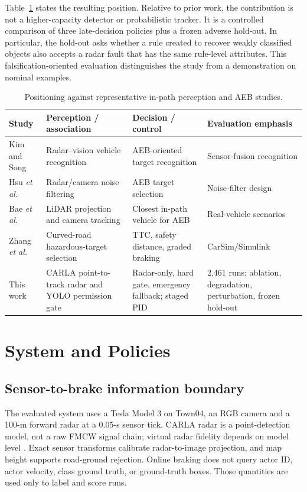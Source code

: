 \documentclass[conference]{IEEEtran}
\begin{document}
Table~\ref{tab:positioning} states the resulting position. Relative to prior
work, the contribution is not a higher-capacity detector or probabilistic
tracker. It is a controlled comparison of three late-decision policies plus a
frozen adverse hold-out. In particular, the hold-out asks whether a rule created
to recover weakly classified objects also accepts a radar fault that has the
same rule-level attributes. This falsification-oriented evaluation distinguishes
the study from a demonstration on nominal examples.

\begin{table}[t]
\caption{Positioning against representative in-path perception and AEB studies.}
\label{tab:positioning}
\centering
\scriptsize
\setlength{\tabcolsep}{4pt}
\begin{tabular}{p{}p{}p{}p{}}
\toprule
Study & Perception / association & Decision / control & Evaluation emphasis\\
\midrule
Kim and Song \cite{kim2013vehicle} & Radar--vision vehicle recognition & AEB-oriented target recognition & Sensor-fusion recognition\\
Hsu \emph{et al.} \cite{hsu2015noise} & Radar/camera noise filtering & AEB target selection & Noise-filter design\\
Bae \emph{et al.} \cite{bae2021cipv} & LiDAR projection and camera tracking & Closest in-path vehicle for AEB & Real-vehicle scenarios\\
Zhang \emph{et al.} \cite{zhang2023curved} & Curved-road hazardous-target selection & TTC, safety distance, graded braking & CarSim/Simulink\\
This work & CARLA point-to-track radar and YOLO permission gate & Radar-only, hard gate, emergency fallback; staged PID & 2,461 runs; ablation, degradation, perturbation, frozen hold-out\\
\bottomrule
\end{tabular}
\end{table}

\section{System and Policies}
\subsection{Sensor-to-brake information boundary}
The evaluated system uses a Tesla Model 3 on Town04, an RGB camera and a
100-m forward radar at a 0.05-s sensor tick. CARLA radar is a point-detection
model, not a raw FMCW signal chain; virtual radar fidelity depends on model
level \cite{magosi2022radar}. Exact sensor transforms calibrate radar-to-image
projection, and map height supports road-ground rejection. Online braking does
not query actor ID, actor velocity, class ground truth, or ground-truth boxes.
Those quantities are used only to label and score runs.
\end{document}
